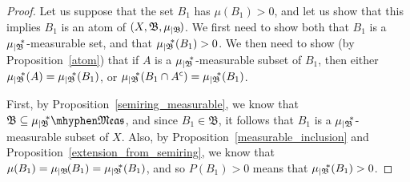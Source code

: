 \documentclass[
twoside=true,
paper=letter,
fontsize=11pt,
pagesize=auto,
leqno,
openany,
headsepline,
overfullrule,
]{scrbook}
\theoremstyle{plain}
\theoremstyle{plain}
\theoremstyle{definition}
\theoremstyle{bfnoteitalic}
\theoremstyle{bfnoteroman}
\newcommand{\sigalg}[1]{\mathfrak{#1}}
\newcommand{\restrictedto}[1]{_{\lvert#1}\kern-1.5pt}
\newcommand{\comp}{^{\hbox{\tiny{$\mathsf C$}}}}
\newcommand{\meets}{\cap}
\newcommand{\sigmaalgebraii}{\sigalg{B}}
\newcommand{\measurable}[1]{{#1}\mhyphen\mathfrak{Meas}}
\newcommand{\Psubstar}[1]{\measure\restrictedto{#1}\kern-2pt^*}
\newcommand{\sigalgb}{\sigmaalgebraii}
\newcommand{\measurespace}{X}
\newcommand{\measure}{\mu}
\begin{document}
\begin{proof} 
Let us suppose that the set $B_1$ has $\measure(B_1)> 0$, and let us show that this implies $B_1$ is an atom of
$(\measurespace, \sigalgb,\measure\restrictedto{\sigalgb})$.
We first need to show both that $B_1$ is a $\Psubstar{\sigalgb}$-measurable set, and that $\Psubstar{\sigalgb}(B_1)>0$. We then need to show (by Proposition~\ref{atom}) that if $A$ is a $\Psubstar{\sigalgb}$-measurable subset of $B_1$, then either $\Psubstar{\sigalgb}(A) = \Psubstar{\sigalgb}(B_1)$, 
or 
$\Psubstar{\sigalgb}(B_1\meets A\comp) = \Psubstar{\sigalgb}(B_1)$. 

First, by Proposition~\ref{semiring_measurable}, we know that 
$\sigalgb\subseteq \measurable{\Psubstar{\sigalgb}}$, and since $B_1\in \sigalgb$, it follows that $B_1$ is a $\Psubstar{\sigalgb}$-measurable subset of $\measurespace$. Also, by Proposition~\ref{measurable_inclusion}  and Proposition~\ref{extension_from_semiring}, we know that 
$\measure(B_1) = 
\measure\restrictedto{\sigalgb}(B_1) =
\Psubstar{\sigalgb}(B_1)$, and so $P(B_1) > 0$ means that  
$\Psubstar{\sigalgb}(B_1) > 0$.


\end{proof}
\end{document}
